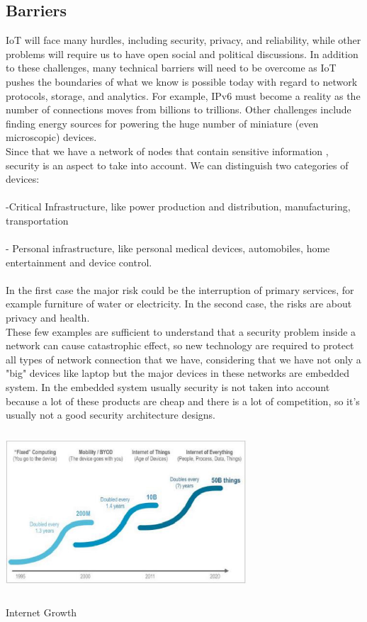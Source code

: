 \documentclass[a4paper,10pt]{article}
\makeatletter
\newenvironment{figurehere}{\def\@captype{figure}\vspace{2ex}}{\vspace{2ex}}
\makeatother
\begin{document}
\begin{multicols}{2}
\subsection{Barriers}
IoT will face many hurdles, including security, privacy, and reliability, while other problems will require us to have open social and political discussions. In addition to these challenges, many technical barriers will need to be overcome 
as IoT pushes the boundaries of what we know is possible today with regard to 
network protocols, storage, and analytics. For example, IPv6 must become a reality 
as the number of connections moves from billions to trillions. Other challenges 
include finding energy sources for powering the huge number of miniature (even 
microscopic) devices.\\

Since that we have a network of nodes that contain sensitive information , security is an aspect to take into account. 
We can distinguish two categories of devices:\\\\
-Critical Infrastructure, like power production and distribution, manufacturing, transportation\\\\
- Personal infrastructure, like personal medical devices, automobiles, home entertainment and device control.\\\\
In the first case the major risk could be the interruption of primary services, for example furniture of water or electricity. In the second case, the risks are about privacy and health.\\

These few examples are sufficient to understand that a security problem inside a network can cause catastrophic effect, so new technology are required to protect all types of network connection that we have, considering that we have not only a "big" devices like laptop but the major devices in these networks are embedded system.
In the embedded system usually security is not taken into account because a lot of these products are cheap and there is a lot of competition, so it's usually not a good security architecture designs.

\begin{figurehere}
 \centering
 \includegraphics[width=9cm, height=6cm]{./eps/Ioe.eps}
 \caption{Internet Growth}
 \label{fig:myfigure2}
\end{figurehere}


\end{multicols}
\end{document}
